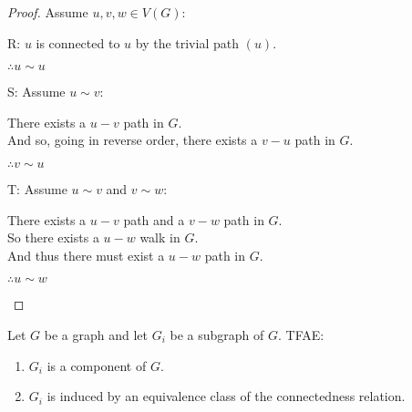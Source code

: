 \documentclass[letterpaper,12pt,fleqn]{article}
\begin{document}
\begin{proof}
  Assume \(u,v,w\in V(G)\):
  \begin{description}
  \item{R:} \(u\) is connected to \(u\) by the trivial path \((u)\).

    \(\therefore u\sim u\)

  \item{S:} Assume \(u\sim v\):

    There exists a \(u-v\) path in \(G\). \\
    And so, going in reverse order, there exists a \(v-u\) path in \(G\).

    \(\therefore v\sim u\)
    
  \item{T:} Assume \(u\sim v\) and \(v\sim w\):

    There exists a \(u-v\) path and a \(v-w\) path in \(G\). \\
    So there exists a \(u-w\) walk in \(G\). \\
    And thus there must exist a \(u-w\) path in \(G\).

    \(\therefore u\sim w\)
  \end{description}
\end{proof}

\begin{theorem}
  Let \(G\) be a graph and let \(G_i\) be a subgraph of \(G\).  TFAE:
  \begin{enumerate}
  \item \(G_i\) is a component of \(G\).
  \item \(G_i\) is induced by an equivalence class of the connectedness relation.
  \end{enumerate}
\end{theorem}
\end{document}
